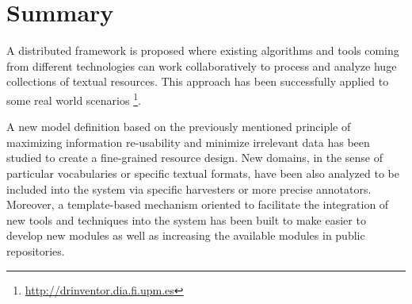 \section{Summary}

A distributed framework is proposed where existing algorithms and tools coming from different technologies can work collaboratively to process and analyze huge collections of textual resources. This approach has been successfully applied to some real world scenarios \footnote{\url{http://drinventor.dia.fi.upm.es}}.
 
A new model definition based on the previously mentioned principle of maximizing information re-usability and minimize irrelevant data has been studied to create a fine-grained resource design. New domains, in the sense of particular vocabularies or specific textual formats, have been also analyzed to be included into the system via specific harvesters or more precise annotators. Moreover, a template-based mechanism oriented to facilitate the integration of new tools and techniques into the system has been built to make easier to develop new modules as well as increasing the available modules in public repositories.